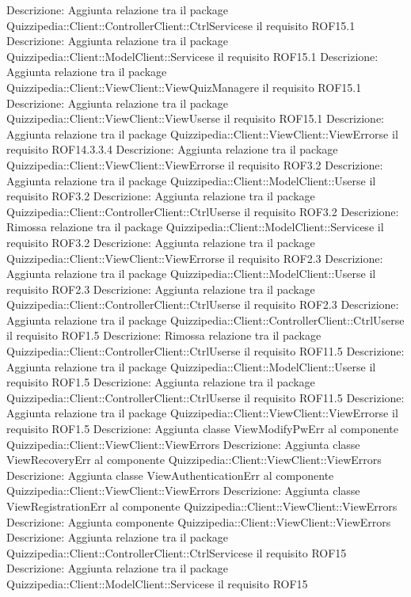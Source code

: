 Descrizione: Aggiunta relazione tra il package Quizzipedia::Client::ControllerClient::CtrlServicese il requisito ROF15.1 
Descrizione: Aggiunta relazione tra il package Quizzipedia::Client::ModelClient::Servicese il requisito ROF15.1 
Descrizione: Aggiunta relazione tra il package Quizzipedia::Client::ViewClient::ViewQuizManagere il requisito ROF15.1 
Descrizione: Aggiunta relazione tra il package Quizzipedia::Client::ViewClient::ViewUserse il requisito ROF15.1 
Descrizione: Aggiunta relazione tra il package Quizzipedia::Client::ViewClient::ViewErrorse il requisito ROF14.3.3.4 
Descrizione: Aggiunta relazione tra il package Quizzipedia::Client::ViewClient::ViewErrorse il requisito ROF3.2 
Descrizione: Aggiunta relazione tra il package Quizzipedia::Client::ModelClient::Userse il requisito ROF3.2 
Descrizione: Aggiunta relazione tra il package Quizzipedia::Client::ControllerClient::CtrlUserse il requisito ROF3.2 
Descrizione: Rimossa relazione tra il package Quizzipedia::Client::ModelClient::Servicese il requisito ROF3.2 
Descrizione: Aggiunta relazione tra il package Quizzipedia::Client::ViewClient::ViewErrorse il requisito ROF2.3 
Descrizione: Aggiunta relazione tra il package Quizzipedia::Client::ModelClient::Userse il requisito ROF2.3 
Descrizione: Aggiunta relazione tra il package Quizzipedia::Client::ControllerClient::CtrlUserse il requisito ROF2.3 
Descrizione: Aggiunta relazione tra il package Quizzipedia::Client::ControllerClient::CtrlUserse il requisito ROF1.5 
Descrizione: Rimossa relazione tra il package Quizzipedia::Client::ControllerClient::CtrlUserse il requisito ROF11.5 
Descrizione: Aggiunta relazione tra il package Quizzipedia::Client::ModelClient::Userse il requisito ROF1.5 
Descrizione: Aggiunta relazione tra il package Quizzipedia::Client::ControllerClient::CtrlUserse il requisito ROF11.5 
Descrizione: Aggiunta relazione tra il package Quizzipedia::Client::ViewClient::ViewErrorse il requisito ROF1.5 
Descrizione: Aggiunta classe ViewModifyPwErr al componente Quizzipedia::Client::ViewClient::ViewErrors 
Descrizione: Aggiunta classe ViewRecoveryErr al componente Quizzipedia::Client::ViewClient::ViewErrors 
Descrizione: Aggiunta classe ViewAuthenticationErr al componente Quizzipedia::Client::ViewClient::ViewErrors 
Descrizione: Aggiunta classe ViewRegistrationErr al componente Quizzipedia::Client::ViewClient::ViewErrors 
Descrizione: Aggiunta componente Quizzipedia::Client::ViewClient::ViewErrors 
Descrizione: Aggiunta relazione tra il package Quizzipedia::Client::ControllerClient::CtrlServicese il requisito ROF15 
Descrizione: Aggiunta relazione tra il package Quizzipedia::Client::ModelClient::Servicese il requisito ROF15 
